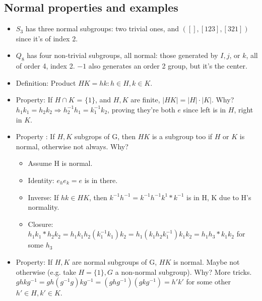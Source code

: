 \documentclass[11pt, oneside]{article}   	%
\begin{document}
\subsection{Normal properties and examples}
\begin{itemize}
\item $S_3$ has three normal subgroups: two trivial ones, and $([], [123], [321])$ since it's of index 2.
\item $Q_8$ has four non-trivial subgroups, all normal: those generated by $I, j$, or $k$, all of order 4, index 2.  $-1$ also generates an order 2 group, but it's the center.
\item Definition: Product $HK = {hk: h \in H, k \in K}$. 
\item Property: If $H \cap K$ = $\{1\}$, and $H, K$ are finite, $|HK| = |H| \cdot |K|$.  Why?  
  $h_1k_1 = h_2k_2 \Longrightarrow h_2^{-1}h_1 = k_1^{-1}k_2$, proving they're both $e$ since left is in $H$, right in $K$.
\item Property : If $H, K$ subgrops of G, then $HK$ is a subgroup too if $H$ or $K$ is normal, otherwise not always.  Why?   
  \begin{itemize}
  \item Assume H is normal.
  \item Identity: $e_he_k = e$ is in there.
  \item Inverse: If $hk \in HK$, then $k^{-1}h^{-1} = k^{-1}h^{-1}k^1 * k^{-1}$ is in H, K due to H's normality.
  \item Closure: $h_1k_1 * h_2k_2  = h_1k_1h_2(k_1^{-1}k_1)k_2 =   h_1 (k_1h_2k_1^{-1}) k_1k_2 =  h_1h_3 * k_1k_2$ for some $h_3$
  \end{itemize}
\item Property: If $H, K$ are normal subgroups of G, $HK$ is normal.  Maybe not otherwise (e.g. take $H = \{1\}, G$ a non-normal subgroup).  Why? More tricks.  $ghkg^{-1} = gh(g^{-1}g)kg^{-1} =(ghg^{-1})(gkg^{-1}) = h'k'$ for some other $h' \in H, k' \in K$.


\end{itemize}
\end{document}
